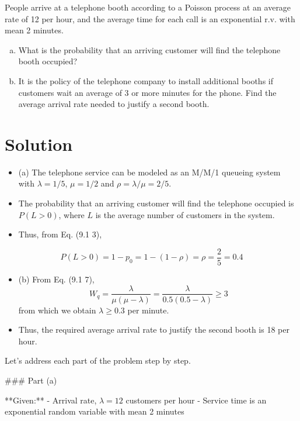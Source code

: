 






People arrive at a telephone booth according to a Poisson process at an average rate of 12 per 
hour, and the average time for each call is an exponential r.v. with mean 2 minutes. 

\begin{enumerate}[(a)]
    \item  What is the probability that an arriving customer will find the telephone booth occupied? 
\item It is the policy of the telephone company to install additional booths if customers wait an 
average of 3 or more minutes for the phone. Find the average arrival rate needed to justify a 
second booth. 
\end{enumerate}

\section*{Solution}
\begin{itemize}
    \item (a) The telephone service can be modeled as an M/M/1 queueing system with $\lambda = 1/5$, $\mu = 1/2$ and $\rho = \lambda / \mu = 2/5$.
\item The probability that an arriving customer will find the telephone occupied is $P(L > 0)$, where 
$L$ is the average number of customers in the system. 
\item Thus, from Eq. (9.1 3), 
\end{itemize}
\[P(L>0) = 1-p_{0} = 1-(1-\rho) = \rho = \frac{2}{5} = 0.4 \]
\begin{itemize}
    \item (b) From Eq. (9.1 7), 
    \[ W_{q} = \frac{\lambda}{\mu(\mu-\lambda)} = \frac{\lambda}{0.5(0.5-\lambda)} \geq 3\]
from which we obtain $\lambda \geq 0.3$ per minute.
\item Thus, the required average arrival rate to justify the second 
booth is 18 per hour.
\end{itemize}

 


Let's address each part of the problem step by step.

### Part (a)

**Given:**
- Arrival rate, \( \lambda = 12 \) customers per hour
- Service time is an exponential random variable with mean 2 minutes

